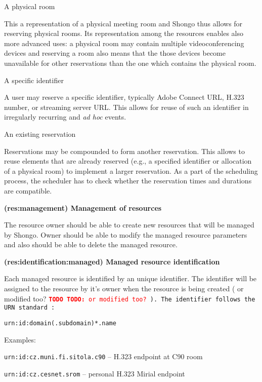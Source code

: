 \documentclass[a4paper]{report}
\makeatletter
\newcounter{UCcounter}
\newenvironment{UseCases}%
	{\begin{list}{\textbf{UC-\arabic{UCcounter}}}{\@nmbrlisttrue\def\@listctr{UCcounter}}}%
	{\end{list}}
\newcommand{\UClabel}[1]{\label{UC:#1}}
\newcommand{\UseCase}[2]{\item\UClabel{#2} \textbf{(#2) #1}\\ \nopagebreak}
\newcommand{\TODO}[1]{%
\def\empty{}%
\def\prvniparametr{#1}%
\ifx\prvniparametr\empty%
\begingroup\tt\textcolor{red}{\noindent\textbf{TODO}}\endgroup
\else%
\begingroup\tt\textcolor{red}{\noindent\textbf{TODO:}\ #1}\endgroup
\fi%
}
\makeatother
\begin{document}
\begin{UseCases}
\begin{compactdesc}
\item[A physical room]

This a representation of a physical meeting room and Shongo thus allows for
reserving physical rooms. Its representation among the resources enables also
more advanced uses: a physical room may contain multiple videoconferencing
devices and reserving a room also means that the those devices become
unavailable for other reservations than the one which contains the physical
room.

\item[A specific identifier]

A user may reserve a specific identifier, typically Adobe Connect URL, H.323
number, or streaming server URL. This allows for reuse of such an identifier in
irregularly recurring and \emph{ad hoc} events.

\item[An existing reservation]

Reservations may be compounded to form another reservation. This allows to
reuse elements that are already reserved (e.g., a specified identifier or
allocation of a physical room) to implement a larger reservation. As a part of
the scheduling process, the scheduler has to check whether the reservation
times and durations are compatible.

\end{compactdesc}


\UseCase{Management of resources}{res:management}

The resource owner should be able to create new resources that will be managed by Shongo. Owner should be able to modify the managed resource parameters and also should be able to delete the managed resource.

\UseCase{Managed resource identification}{res:identification:managed}

Each managed resource is identified by an unique identifier. The identifier will be 
assigned to the resource by it's owner when the resource is being created 
(\TODO{or modified too?}). The identifier follows the URN standard \cite{rfc2141}:
\begin{verbatim}
urn:id:domain(.subdomain)*.name
\end{verbatim}
Examples: 
\begin{compactitem}
\item \verb|urn:id:cz.muni.fi.sitola.c90| -- H.323 endpoint at C90 room
\item \verb|urn:id:cz.cesnet.srom| -- personal H.323 Mirial endpoint
\end{compactitem}


\end{UseCases}
\end{document}
